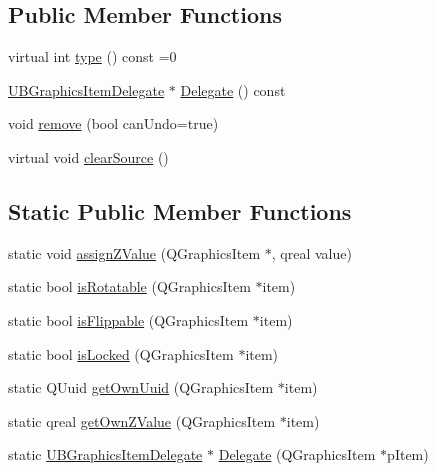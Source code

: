 \subsection*{Public Member Functions}
\begin{DoxyCompactItemize}
\item 
virtual int \hyperlink{class_u_b_graphics_item_acab0781401cac08c9ad99b0cd0fa8480}{type} () const =0
\item 
\hyperlink{class_u_b_graphics_item_delegate}{U\-B\-Graphics\-Item\-Delegate} $\ast$ \hyperlink{class_u_b_graphics_item_ac8a143db621d9be68be5f3c9da0f1405}{Delegate} () const 
\item 
void \hyperlink{class_u_b_graphics_item_afddba655f7a4db42baf53bc797bc6ab9}{remove} (bool can\-Undo=true)
\item 
virtual void \hyperlink{class_u_b_graphics_item_a83e8d1b8f4bbbc024a15f645a39d6e49}{clear\-Source} ()
\end{DoxyCompactItemize}
\subsection*{Static Public Member Functions}
\begin{DoxyCompactItemize}
\item 
static void \hyperlink{class_u_b_graphics_item_af0b4688328f6b7c06e2f8e2ca5f80805}{assign\-Z\-Value} (Q\-Graphics\-Item $\ast$, qreal value)
\item 
static bool \hyperlink{class_u_b_graphics_item_a042f9b2d376404863cc0c5a0bece8a91}{is\-Rotatable} (Q\-Graphics\-Item $\ast$item)
\item 
static bool \hyperlink{class_u_b_graphics_item_afa477f8a912ae563482a227555fc9ac6}{is\-Flippable} (Q\-Graphics\-Item $\ast$item)
\item 
static bool \hyperlink{class_u_b_graphics_item_ad63fbb8693d958ddb764de33ddc251bd}{is\-Locked} (Q\-Graphics\-Item $\ast$item)
\item 
static Q\-Uuid \hyperlink{class_u_b_graphics_item_a2713cca20df6a94a8d19ce17a342534d}{get\-Own\-Uuid} (Q\-Graphics\-Item $\ast$item)
\item 
static qreal \hyperlink{class_u_b_graphics_item_a6952774d19830afc8429f649a7163390}{get\-Own\-Z\-Value} (Q\-Graphics\-Item $\ast$item)
\item 
static \hyperlink{class_u_b_graphics_item_delegate}{U\-B\-Graphics\-Item\-Delegate} $\ast$ \hyperlink{class_u_b_graphics_item_a5d46f6a79c685a5fb14da104ffa5e755}{Delegate} (Q\-Graphics\-Item $\ast$p\-Item)
\end{DoxyCompactItemize}
